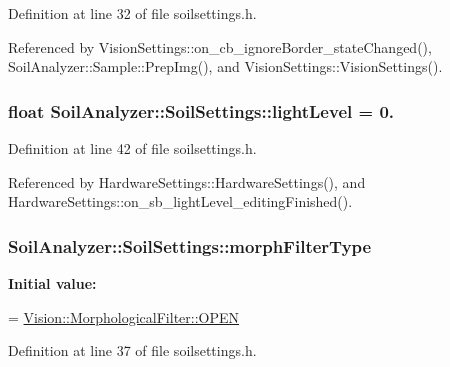 Definition at line 32 of file soilsettings.\+h.



Referenced by Vision\+Settings\+::on\+\_\+cb\+\_\+ignore\+Border\+\_\+state\+Changed(), Soil\+Analyzer\+::\+Sample\+::\+Prep\+Img(), and Vision\+Settings\+::\+Vision\+Settings().

\hypertarget{class_soil_analyzer_1_1_soil_settings_aa4d3ed8c1ab6551bfa4763e8a1ffc148}{}
\subsubsection[{light\+Level}]{\setlength{\rightskip}{0pt plus 5cm}float Soil\+Analyzer\+::\+Soil\+Settings\+::light\+Level = 0.}\label{class_soil_analyzer_1_1_soil_settings_aa4d3ed8c1ab6551bfa4763e8a1ffc148}


Definition at line 42 of file soilsettings.\+h.



Referenced by Hardware\+Settings\+::\+Hardware\+Settings(), and Hardware\+Settings\+::on\+\_\+sb\+\_\+light\+Level\+\_\+editing\+Finished().

\hypertarget{class_soil_analyzer_1_1_soil_settings_ad1420c4800badb3eb07eba4767e3df81}{}
\subsubsection[{morph\+Filter\+Type}]{ Soil\+Analyzer\+::\+Soil\+Settings\+::morph\+Filter\+Type}\label{class_soil_analyzer_1_1_soil_settings_ad1420c4800badb3eb07eba4767e3df81}
{\bfseries Initial value\+:}
\begin{DoxyCode}
=
      \hyperlink{class_vision_1_1_morphological_filter_a1f19c9cb13f0d68778c77d6fd0370868afd436eed00afa15b23eeac4de3509303}{Vision::MorphologicalFilter::OPEN}
\end{DoxyCode}


Definition at line 37 of file soilsettings.\+h.



